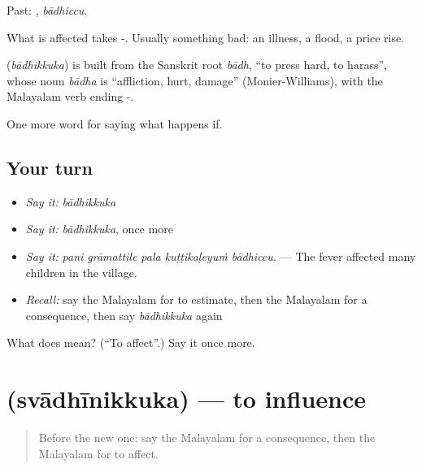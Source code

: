 Past: , \emph{bādhiccu}.

What is affected takes -. Usually something bad: an illness, a flood, a price rise.

\begin{cousinweb}
\textbf{} (\emph{bādhikkuka}) is built from the Sanskrit root \emph{bādh}, \textquotedblleft{}to press hard, to harass\textquotedblright{}, whose noun \emph{bādha} is \textquotedblleft{}affliction, hurt, damage\textquotedblright{} (Monier-Williams), with the Malayalam verb ending -.
\end{cousinweb}

\begin{grammarlens}[title={What you've built}]
One more word for saying what happens if.
\end{grammarlens}

\subsection*{Your turn}
\begin{itemize}
\raggedright
  \item \emph{Say it:} \emph{bādhikkuka}
  \item \emph{Say it:} \emph{bādhikkuka}, once more
  \item \emph{Say it:} \emph{pani grāmattile pala kuṭṭikaḷeyuṁ bādhiccu.} — The fever affected many children in the village.
  \item \emph{Recall:} say the Malayalam for to estimate, then the Malayalam for a consequence, then say \emph{bādhikkuka} again
\end{itemize}

\begin{tcolorbox}[breakable,colback=teal!4,colframe=teal!35!black,title={Before you move on}]
What does  mean? (\textquotedblleft{}To affect\textquotedblright{}.) Say it once more.
\end{tcolorbox}
\section[\texorpdfstring{\ml{സ്വാധീനിക്കുക} (svādhīnikkuka)}{സ്വാധീനിക്കുക (svādhīnikkuka)}]{ (svādhīnikkuka) — to influence}

\label{lesson:ML-C443-svadhinikkuka}



\begin{quote}
Before the new one: say the Malayalam for a consequence, then the Malayalam for to affect.
\end{quote}

